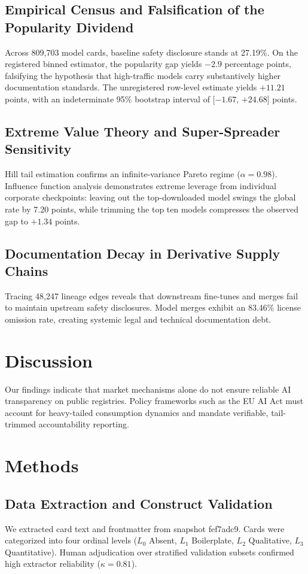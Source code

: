 \documentclass[11pt,a4paper]{article}
\begin{document}
\subsection*{Empirical Census and Falsification of the Popularity Dividend}
Across 809,703 model cards, baseline safety disclosure stands at 27.19\%. On the registered binned estimator, the popularity gap yields $-2.9$ percentage points, falsifying the hypothesis that high-traffic models carry substantively higher documentation standards. The unregistered row-level estimate yields $+11.21$ points, with an indeterminate 95\% bootstrap interval of [$-1.67$, $+24.68$] points.

\subsection*{Extreme Value Theory and Super-Spreader Sensitivity}
Hill tail estimation confirms an infinite-variance Pareto regime ($\alpha = 0.98$). Influence function analysis demonstrates extreme leverage from individual corporate checkpoints: leaving out the top-downloaded model swings the global rate by 7.20 points, while trimming the top ten models compresses the observed gap to $+1.34$ points.

\subsection*{Documentation Decay in Derivative Supply Chains}
Tracing 48,247 lineage edges reveals that downstream fine-tunes and merges fail to maintain upstream safety disclosures. Model merges exhibit an 83.46\% license omission rate, creating systemic legal and technical documentation debt.

\section*{Discussion}
Our findings indicate that market mechanisms alone do not ensure reliable AI transparency on public registries. Policy frameworks such as the EU AI Act must account for heavy-tailed consumption dynamics and mandate verifiable, tail-trimmed accountability reporting.

\section*{Methods}
\subsection*{Data Extraction and Construct Validation}
We extracted card text and frontmatter from snapshot fef7adc9. Cards were categorized into four ordinal levels ($L_0$ Absent, $L_1$ Boilerplate, $L_2$ Qualitative, $L_3$ Quantitative). Human adjudication over stratified validation subsets confirmed high extractor reliability ($\kappa = 0.81$).
\end{document}
